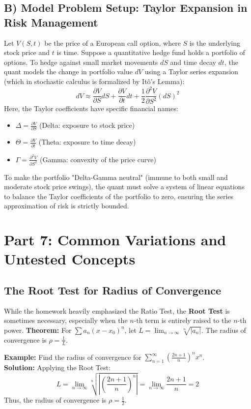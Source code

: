 \documentclass[11pt, letterpaper]{article}
\theoremstyle{definition}
\theoremstyle{remark}
\begin{document}
\subsection{B) Model Problem Setup: Taylor Expansion in Risk Management}
Let $V(S, t)$ be the price of a European call option, where $S$ is the underlying stock price and $t$ is time. Suppose a quantitative hedge fund holds a portfolio of options. To hedge against small market movements $dS$ and time decay $dt$, the quant models the change in portfolio value $dV$ using a Taylor series expansion (which in stochastic calculus is formalized by It\^{o}'s Lemma):
\[ dV \approx \frac{\partial V}{\partial S} dS + \frac{\partial V}{\partial t} dt + \frac{1}{2} \frac{\partial^2 V}{\partial S^2} (dS)^2 \]
Here, the Taylor coefficients have specific financial names:
\begin{itemize}
    \item $\Delta = \frac{\partial V}{\partial S}$ (Delta: exposure to stock price)
    \item $\Theta = \frac{\partial V}{\partial t}$ (Theta: exposure to time decay)
    \item $\Gamma = \frac{\partial^2 V}{\partial S^2}$ (Gamma: convexity of the price curve)
\end{itemize}
To make the portfolio "Delta-Gamma neutral" (immune to both small and moderate stock price swings), the quant must solve a system of linear equations to balance the Taylor coefficients of the portfolio to zero, ensuring the series approximation of risk is strictly bounded.

\newpage
\section{Part 7: Common Variations and Untested Concepts}

\subsection{The Root Test for Radius of Convergence}
While the homework heavily emphasized the Ratio Test, the \textbf{Root Test} is sometimes necessary, especially when the $n$-th term is entirely raised to the $n$-th power.
\textbf{Theorem:} For $\sum a_n (x-x_0)^n$, let $L = \lim_{n \to \infty} \sqrt[n]{|a_n|}$. The radius of convergence is $\rho = \frac{1}{L}$.

\textbf{Example:} Find the radius of convergence for $\sum_{n=1}^{\infty} \left(\frac{2n+1}{n}\right)^n x^n$.
\\[6pt]
\textbf{Solution:} Applying the Root Test:
\[ L = \lim_{n \to \infty} \sqrt[n]{\left| \left(\frac{2n+1}{n}\right)^n \right|} = \lim_{n \to \infty} \frac{2n+1}{n} = 2 \]
Thus, the radius of convergence is $\rho = \frac{1}{2}$.
\end{document}
